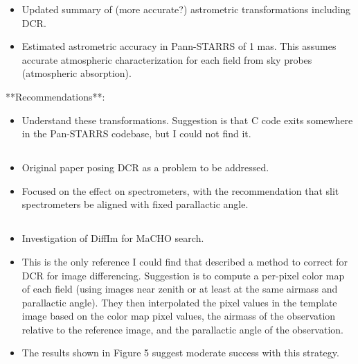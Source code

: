\documentclass[]{article}
\begin{document}
\begin{itemize}
	\item Updated summary of (more accurate?) astrometric transformations including DCR.
	\item Estimated astrometric accuracy in Pann-STARRS of 1
          mas. This assumes accurate atmospheric characterization for
          each field from sky probes (atmospheric absorption).
\end{itemize}

**Recommendations**:
\begin{itemize}
	\item Understand these transformations. Suggestion is that C
          code exits somewhere in the Pan-STARRS codebase, but I could
          not find it.
\end{itemize}

\subsection{\cite{Cuby1998}}

\subsection{\cite{Filippenko1982}}
\begin{itemize}
	\item Original paper posing DCR as a problem to be addressed.
	\item Focused on the effect on spectrometers, with the
          recommendation that slit spectrometers be aligned with fixed
          parallactic angle.
\end{itemize}

\subsection{\cite{AlcockDiffIm1999}}
\begin{itemize}
\item Investigation of DiffIm for MaCHO search.
\item This is the only reference I could find that described a method
  to correct for DCR for image differencing. Suggestion is to compute a
  per-pixel color map of each field (using images near zenith or at
  least at the same airmass and parallactic angle). They then
  interpolated the pixel values in the template image based on the
  color map pixel values, the airmass of the observation relative to
  the reference image, and the parallactic angle of the observation.
\item The results shown in Figure 5 suggest moderate success with this
  strategy.
\end{itemize}
\end{document}
